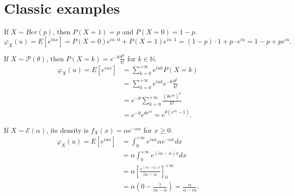 \section{Classic examples}%
\begin{example}
If $X \sim Ber(p)$, then $P(X=1) = p$ and $P(X=0) = 1-p$.
\[ \varphi_X(u) = E[e^{iux}] = P(X=0)e^{iu \cdot 0} + P(X=1)e^{iu \cdot 1} = (1-p) \cdot 1 + p \cdot e^{iu} = 1-p+pe^{iu}. \]
\end{example}%
\begin{example}
If $X \sim \mathcal{P}(\theta)$, then $P(X=k) = e^{-\theta} \frac{\theta^k}{k!}$ for $k \in \mathbb{N}$.
\begin{align*}
\varphi_X(u) = E[e^{iux}] &= \sum_{k=0}^{+\infty} e^{iuk} P(X=k) \\
&= \sum_{k=0}^{+\infty} e^{iuk} e^{-\theta} \frac{\theta^k}{k!} \\
&= e^{-\theta} \sum_{k=0}^{+\infty} \frac{(\theta e^{iu})^k}{k!} \\
&= e^{-\theta} e^{\theta e^{iu}} = e^{\theta(e^{iu}-1)}.
\end{align*}
\end{example}%
\begin{example}
If $X \sim \mathcal{E}(\alpha)$, its density is $f_X(x) = \alpha e^{-\alpha x}$ for $x \ge 0$.
\begin{align*}
\varphi_X(u) = E[e^{iux}] &= \int_{0}^{+\infty} e^{iux} \alpha e^{-\alpha x} dx \\
&= \alpha \int_{0}^{+\infty} e^{(iu-\alpha)x} dx \\
&= \alpha \left[ \frac{e^{(iu-\alpha)x}}{iu-\alpha} \right]_{0}^{+\infty} \\
&= \alpha \left( 0 - \frac{1}{iu-\alpha} \right) = \frac{\alpha}{\alpha - iu}.
\end{align*}
\end{example}%
